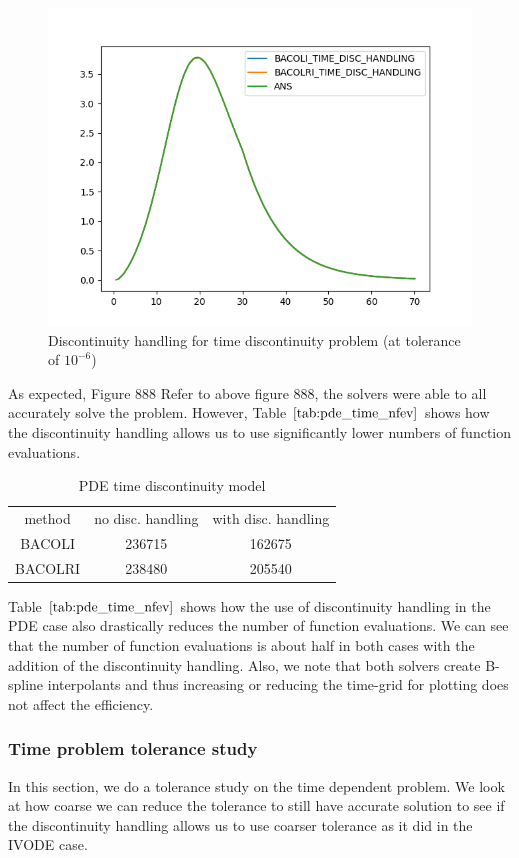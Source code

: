 \documentclass{article}
\begin{document}
\begin{figure}[H]
\centering
\includegraphics[width=0.7\linewidth]{./figures/pde_time_disc_disc_hand}
\caption{Discontinuity handling for time discontinuity problem (at tolerance of $10^{-6}$)}
\label{fig:pde_time_disc_disc_hand}
\end{figure}

As expected, Figure 888 Refer to above figure 888, the solvers were able to all accurately solve the problem. However, Table $\ref{tab:pde_time_nfev}$ shows how the discontinuity handling allows us to use significantly lower numbers of function evaluations.

\begin{table}[h]
\caption {PDE time discontinuity model} 
\label{tab:pde_time_nfev}
\begin{center}
\begin{tabular}{ c c c } 
method  & no disc. handling & with disc. handling \\ 
BACOLI  & 236715     &   162675     \\
BACOLRI & 238480     &   205540    \\
\end{tabular}
\end{center}
\end{table} 

Table $\ref{tab:pde_time_nfev}$ shows how the use of discontinuity handling in the PDE case also drastically reduces the number of function evaluations. We can see that the number of function evaluations is about half in both cases with the addition of the discontinuity handling. Also, we note that both solvers create B-spline interpolants and thus increasing or reducing the time-grid for plotting does not affect the efficiency. 

\subsubsection{Time problem tolerance study}
In this section, we do a tolerance study on the time dependent problem. We look at how coarse we can reduce the tolerance to still have accurate solution to see if the discontinuity handling allows us to use coarser tolerance as it did in the IVODE case.
\end{document}
